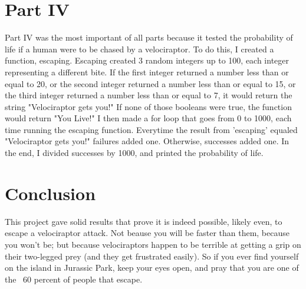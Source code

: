 \documentclass[twocolumn]{revtex4}
\begin{document}
\section{Part IV}
Part IV was the most important of all parts because it tested the probability of life if a human were to be chased by a velociraptor. To do this, I created a function, escaping. Escaping created 3 random integers up to 100, each integer representing a different bite. If the first integer returned a number less than or equal to 20, or the second integer returned a number less than or equal to 15, or the third integer returned a number less than or equal to 7, it would return the string "Velociraptor gets you!" If none of those booleans were true, the function would return "You Live!" I then made a for loop that goes from 0 to 1000, each time running the escaping function. Everytime the result from 'escaping' equaled "Velociraptor gets you!" failures added one. Otherwise, successes added one. In the end, I divided successes by 1000, and printed the probability of life.

\section{Conclusion}
This project gave solid results that prove it is indeed possible, likely even, to escape a velociraptor attack. Not beause you will be faster than them, because you won't be; but because velociraptors happen to be terrible at getting a grip on their two-legged prey (and they get frustrated easily). So if you ever find yourself on the island in Jurassic Park, keep your eyes open, and pray that you are one of the ~60 percent of people that escape.
	
\end{document}
